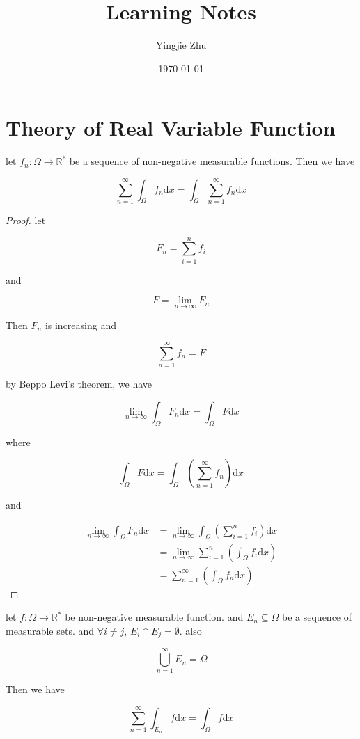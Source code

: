 \documentclass[11pt,a4paper]{article}
\title{Learning Notes}
\author{Yingjie Zhu}
\date{\today}
\begin{document}
\section{Theory of Real Variable Function}
\begin{exercise}
    let $f_n: \Omega \to \mathbb{R}^*$ be a sequence of non-negative measurable functions. Then we have

    \[
        \sum_{n=1}^{\infty}\int_{\Omega}f_n \mathrm{d}x =\int_{\Omega}\sum_{n=1}^{\infty}f_n \mathrm{d}x
    \]
\end{exercise}

\begin{proof}
    let 

    \[
        F_n = \sum_{i=1}^{n}f_i
    \]

    and

    \[
        F = \lim_{n \to \infty} F_n
    \]

    Then $F_n$ is increasing and 

    \[
        \sum_{n=1}^{\infty}f_n = F
    \]

    by Beppo Levi's theorem, we have

    \[
        \lim_{n \to \infty}\int_{\Omega}F_n \mathrm{d}x = \int_{\Omega}F \mathrm{d}x
    \]

    where

    \[
\int_{\Omega}F \mathrm{d}x = \int_{\Omega}\left( \sum_{n=1}^{\infty}f_n \right) \mathrm{d}x
    \]

    and

    \begin{align*}
\lim_{n \to \infty}\int_{\Omega}F_n \mathrm{d}x &= \lim_{n \to \infty}\int_{\Omega}\left( \sum_{i=1}^{n}f_i \right) \mathrm{d}x \\
&= \lim_{n \to \infty}\sum_{i=1}^{n}\left( \int_{\Omega}f_i \mathrm{d}x \right) \\
&= \sum_{n=1}^{\infty}\left( \int_{\Omega}f_n \mathrm{d}x \right)
    \end{align*}
\end{proof}

\begin{exercise}
    let $f: \Omega \to \mathbb{R}^*$ be non-negative measurable function. and $E_n \subseteq \Omega$ be a sequence of measurable sets.
    and $\forall i \ne j,\, E_i \cap E_j = \emptyset$. also

    \[
        \bigcup_{n=1}^{\infty}E_n = \Omega
    \]

    Then we have

    \[
        \sum_{n=1}^{\infty} \int_{E_n} f \mathrm{d}x =  \int_{\Omega} f \mathrm{d}x
    \]
\end{exercise}
\end{document}
